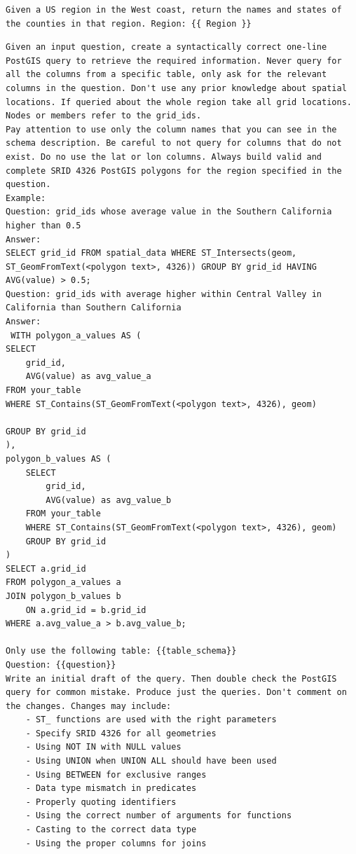 \begin{tcolorbox}[title=PROMPT: Region to Counties, width=\linewidth, colframe=navy]
    \begin{lstlisting}[basicstyle=\ttfamily\footnotesize,breaklines=true, columns=fullflexible,showstringspaces=false, keepspaces=true, belowskip=0pt, aboveskip=0pt,breakindent=0pt] 
Given a US region in the West coast, return the names and states of the counties in that region. Region: {{ Region }} \end{lstlisting}
\end{tcolorbox}
\begin{tcolorbox}[title=PROMPT: PostGIS Prompt Generation, width=\linewidth, colframe=navy, breakable]
    \begin{lstlisting}[basicstyle=\ttfamily\footnotesize,breaklines=true, columns=fullflexible,showstringspaces=false, keepspaces=true, belowskip=0pt, aboveskip=0pt,breakindent=0pt] Given an input question, create a syntactically correct one-line PostGIS query to retrieve the required information. Never query for all the columns from a specific table, only ask for the relevant columns in the question. Don't use any prior knowledge about spatial locations. If queried about the whole region take all grid locations. Nodes or members refer to the grid_ids.
Pay attention to use only the column names that you can see in the schema description. Be careful to not query for columns that do not exist. Do no use the lat or lon columns. Always build valid and complete SRID 4326 PostGIS polygons for the region specified in the question.
Example:
Question: grid_ids whose average value in the Southern California higher than 0.5
Answer: 
SELECT grid_id FROM spatial_data WHERE ST_Intersects(geom, ST_GeomFromText(<polygon text>, 4326)) GROUP BY grid_id HAVING AVG(value) > 0.5;
Question: grid_ids with average higher within Central Valley in California than Southern California
Answer:  
 WITH polygon_a_values AS (
SELECT
    grid_id,
    AVG(value) as avg_value_a
FROM your_table
WHERE ST_Contains(ST_GeomFromText(<polygon text>, 4326), geom)

GROUP BY grid_id
),
polygon_b_values AS (
    SELECT
        grid_id,
        AVG(value) as avg_value_b
    FROM your_table
    WHERE ST_Contains(ST_GeomFromText(<polygon text>, 4326), geom)
    GROUP BY grid_id
)
SELECT a.grid_id
FROM polygon_a_values a
JOIN polygon_b_values b
    ON a.grid_id = b.grid_id
WHERE a.avg_value_a > b.avg_value_b;

Only use the following table: {{table_schema}}
Question: {{question}} 
Write an initial draft of the query. Then double check the PostGIS query for common mistake. Produce just the queries. Don't comment on the changes. Changes may include:
    - ST_ functions are used with the right parameters
    - Specify SRID 4326 for all geometries
    - Using NOT IN with NULL values
    - Using UNION when UNION ALL should have been used
    - Using BETWEEN for exclusive ranges
    - Data type mismatch in predicates
    - Properly quoting identifiers
    - Using the correct number of arguments for functions
    - Casting to the correct data type
    - Using the proper columns for joins


\end{lstlisting}
\end{tcolorbox}
